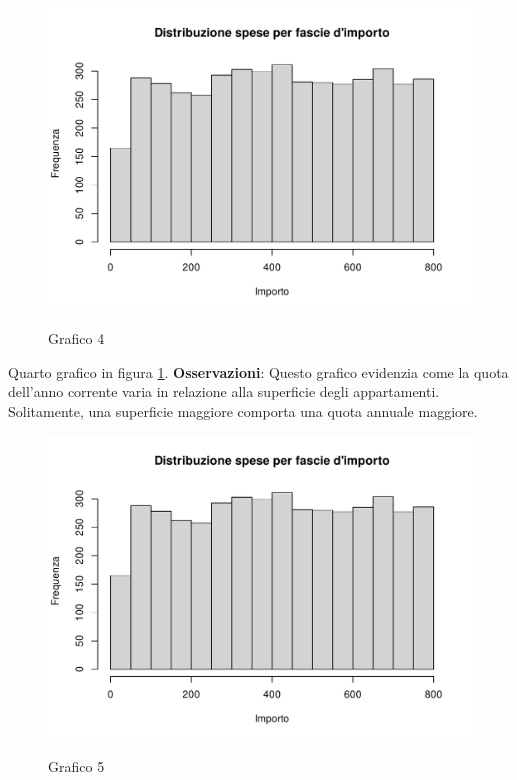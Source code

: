 \clearpage

\begin{figure}[t]
	\caption{Grafico 4}
	\includegraphics[page=4,width=\textwidth]{../R/grafici.pdf}
	\label{fig3}
\end{figure}

Quarto grafico in figura \ref{fig3}. \textbf{Osservazioni}: Questo grafico evidenzia come la quota dell'anno corrente varia in relazione alla superficie degli appartamenti. Solitamente, una superficie maggiore comporta una quota annuale maggiore.

\clearpage

\begin{figure}[t]
	\caption{Grafico 5}
	\includegraphics[page=5,width=\textwidth]{../R/grafici.pdf}
	\label{fig5}
\end{figure}

